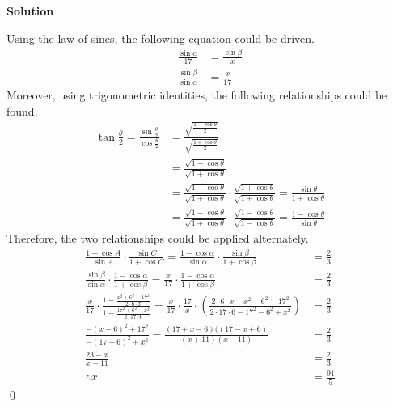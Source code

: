 \documentclass{article}
\newenvironment{solution}{\begin{trivlist}\item[]{\bf Solution}}{\qed \end{trivlist}}
\begin{document}
\begin{solution}
\begin{center}
\end{center}
Using the law of sines, the following equation could be driven.
\begin{align*} 
    \frac{\sin\alpha}{17} &= \frac{\sin\beta}{x} \\
    \frac{\sin\beta}{\sin\alpha} &= \frac{x}{17}
\end{align*}
Moreover, using trigonometric identities, the following relationships could be found.
\begin{align*}
    \tan\frac{\theta}{2} = \frac{\sin\frac{\theta}{2}}{\cos\frac{\theta}{2}}
    &= \frac{\sqrt{\frac{1 - \cos\theta}{2}}}{\sqrt{\frac{1 + \cos\theta}{2}}} \\[0.5em]
    &= \frac{\sqrt{1 - \cos\theta}}{\sqrt{1 + \cos\theta}} \\[0.5em]
    &= \frac{\sqrt{1 - \cos\theta}}{\sqrt{1 + \cos\theta}} \cdot \frac{\sqrt{1 + \cos\theta}}{\sqrt{1 + \cos\theta}} = \frac{\sin\theta}{1 + \cos\theta} \\[0.5em]
    &= \frac{\sqrt{1 - \cos\theta}}{\sqrt{1 + \cos\theta}} \cdot \frac{\sqrt{1 - \cos\theta}}{\sqrt{1 - \cos\theta}} = \frac{1 - \cos\theta}{\sin\theta}
\end{align*}
Therefore, the two relationships could be applied alternately.
\begin{align*}
    \frac{1 - \cos A}{\sin A} \cdot \frac{\sin C}{1 + \cos C} = \frac{1 - \cos\alpha}{\sin\alpha} \cdot \frac{\sin\beta}{1 + \cos\beta} &= \frac{2}{3} \\
    \frac{\sin\beta}{\sin\alpha} \cdot \frac{1 - \cos\alpha}{1 + \cos\beta} = \frac{x}{17} \cdot \frac{1 - \cos\alpha}{1 + \cos\beta} &= \frac{2}{3} \\
    \frac{x}{17} \cdot \frac{1 - \frac{x^2 + 6^2 - 17^2}{2 \cdot 6 \cdot x}}{1 - \frac{17^2 + 6^2 - x^2}{2 \cdot 17 \cdot 6}} = \frac{x}{17} \cdot \frac{17}{x} \cdot \left( \frac{2 \cdot 6 \cdot x - x^2 - 6^2 + 17^2}{2 \cdot 17 \cdot 6 - 17^2 - 6^2 + x^2} \right) &= \frac{2}{3} \\
    \frac{-(x - 6)^2 + 17^2}{-(17 - 6)^2 + x^2} = \frac{(17 + x - 6)((17 - x + 6)}{(x + 11)(x - 11)} &= \frac{2}{3} \\
    \frac{23 - x}{x - 11} &= \frac{2}{3} \\
    \therefore x &= \boxed{\frac{91}{5}}
\end{align*}
\end{solution}
\end{document}
